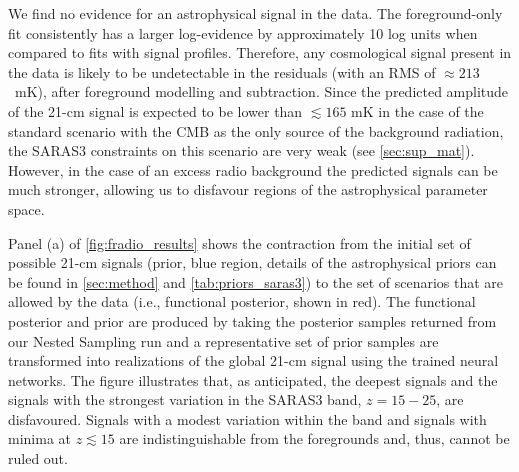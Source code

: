 We find no evidence for an astrophysical signal in the data. The foreground-only fit consistently has a larger log-evidence by approximately 10 log units when compared to fits with signal profiles. %
Therefore,  any cosmological signal present in the data is likely to be undetectable in the residuals (with an RMS of $\approx 213$~mK), after foreground modelling and subtraction. Since the predicted amplitude of the 21-cm signal is expected to be lower than $\lesssim 165$ mK \cite{Reis_sta_2021} in the case of the standard scenario with the CMB as the only source of the background radiation, the SARAS3 constraints on this scenario are very weak (see \cref{sec:sup_mat}). However, in the case of an excess radio background the predicted signals can be much stronger, allowing us to disfavour regions of the astrophysical parameter space. 

Panel (a) of \cref{fig:fradio_results} shows the contraction from the initial  set of possible 21-cm signals (prior, blue region, details of the astrophysical priors can be found in \cref{sec:method} and \cref{tab:priors_saras3}) to the set of scenarios that are allowed by the data (i.e., functional posterior, shown in red). The functional posterior and prior are produced by taking the posterior samples returned from our Nested Sampling run and a representative set of prior samples are transformed into realizations of the global 21-cm signal using the trained neural networks. The figure illustrates that, as anticipated, the deepest signals and the signals with the strongest variation in the SARAS3 band, $z = 15-25$, are disfavoured. Signals with a modest variation within the band and signals with minima at $z \lesssim 15$ are indistinguishable from the foregrounds and, thus, cannot be ruled out. 


